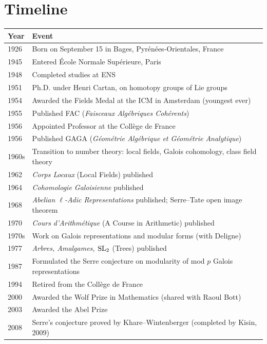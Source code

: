 \section*{Timeline}
\begin{tabular}{|p{1.8cm}|p{11.5cm}|}
\hline
\textbf{Year} & \textbf{Event} \\ \hline
1926 & Born on September 15 in Bages, Pyr\'en\'ees-Orientales, France \\ \hline
1945 & Entered \'Ecole Normale Sup\'erieure, Paris \\ \hline
1948 & Completed studies at ENS \\ \hline
1951 & Ph.D. under Henri Cartan, on homotopy groups of Lie groups \\ \hline
1954 & Awarded the Fields Medal at the ICM in Amsterdam (youngest ever) \\ \hline
1955 & Published FAC (\textit{Faisceaux Alg\'ebriques Coh\'erents}) \\ \hline
1956 & Appointed Professor at the Coll\`ege de France \\ \hline
1956 & Published GAGA (\textit{G\'eom\'etrie Alg\'ebrique et G\'eom\'etrie Analytique}) \\ \hline
1960s & Transition to number theory: local fields, Galois cohomology, class field theory \\ \hline
1962 & \textit{Corps Locaux} (Local Fields) published \\ \hline
1964 & \textit{Cohomologie Galoisienne} published \\ \hline
1968 & \textit{Abelian \(\ell\)-Adic Representations} published; Serre--Tate open image theorem \\ \hline
1970 & \textit{Cours d'Arithm\'etique} (A Course in Arithmetic) published \\ \hline
1970s & Work on Galois representations and modular forms (with Deligne) \\ \hline
1977 & \textit{Arbres, Amalgames, \(\operatorname{SL}_2\)} (Trees) published \\ \hline
1987 & Formulated the Serre conjecture on modularity of mod \(p\) Galois representations \\ \hline
1994 & Retired from the Coll\`ege de France \\ \hline
2000 & Awarded the Wolf Prize in Mathematics (shared with Raoul Bott) \\ \hline
2003 & Awarded the Abel Prize \\ \hline
2008 & Serre's conjecture proved by Khare--Wintenberger (completed by Kisin, 2009) \\ \hline
\end{tabular}

